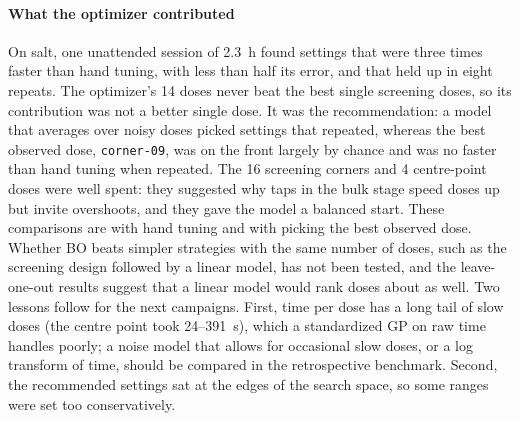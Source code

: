 \documentclass[preprint,12pt]{elsarticle}
\begin{document}
\paragraph{What the optimizer contributed} On salt, one unattended session of 2.3~h found settings that were three times faster than hand tuning, with less than half its error, and that held up in eight repeats. The optimizer's 14 doses never beat the best single screening doses, so its contribution was not a better single dose. It was the recommendation: a model that averages over noisy doses picked settings that repeated, whereas the best observed dose, \texttt{corner-09}, was on the front largely by chance and was no faster than hand tuning when repeated. The 16 screening corners and 4 centre-point doses were well spent: they suggested why taps in the bulk stage speed doses up but invite overshoots, and they gave the model a balanced start. These comparisons are with hand tuning and with picking the best observed dose. Whether BO beats simpler strategies with the same number of doses, such as the screening design followed by a linear model, has not been tested, and the leave-one-out results suggest that a linear model would rank doses about as well. Two lessons follow for the next campaigns. First, time per dose has a long tail of slow doses (the centre point took 24--391~s), which a standardized GP on raw time handles poorly; a noise model that allows for occasional slow doses, or a log transform of time, should be compared in the retrospective benchmark. Second, the recommended settings sat at the edges of the search space, so some ranges were set too conservatively.
\end{document}
